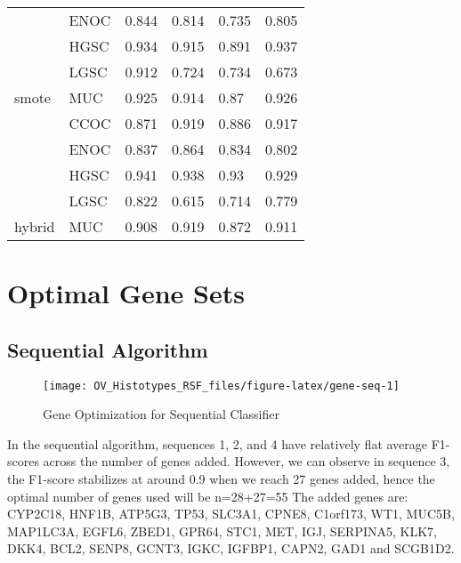 \documentclass[
]{report}
\begin{document}
\begin{table}
\begin{tabular}[t]{l|l|l|l|l|l}
\cline{2-6}
 & ENOC & 0.844 & 0.814 & 0.735 & 0.805\\
\cline{2-6}
 & HGSC & 0.934 & 0.915 & 0.891 & 0.937\\
\cline{2-6}
 & LGSC & 0.912 & 0.724 & 0.734 & 0.673\\
\cline{2-6}
\multirow{-5}{*}{\raggedright\arraybackslash smote} & MUC & 0.925 & 0.914 & 0.87 & 0.926\\
\cline{1-6}
 & CCOC & 0.871 & 0.919 & 0.886 & 0.917\\
\cline{2-6}
 & ENOC & 0.837 & 0.864 & 0.834 & 0.802\\
\cline{2-6}
 & HGSC & 0.941 & 0.938 & 0.93 & 0.929\\
\cline{2-6}
 & LGSC & 0.822 & 0.615 & 0.714 & 0.779\\
\cline{2-6}
\multirow{-5}{*}{\raggedright\arraybackslash hybrid} & MUC & 0.908 & 0.919 & 0.872 & 0.911\\
\hline
\end{tabular}
\end{table}

\hypertarget{optimal-gene-sets}{%
\section{Optimal Gene Sets}\label{optimal-gene-sets}}

\hypertarget{sequential-algorithm-1}{%
\subsection{Sequential Algorithm}\label{sequential-algorithm-1}}

\begin{figure}[H]

{\centering \texttt{[image: OV\_Histotypes\_RSF\_files/figure-latex/gene-seq-1]} 

}

\caption{Gene Optimization for Sequential Classifier}\label{fig:gene-seq}
\end{figure}

In the sequential algorithm, sequences 1, 2, and 4 have relatively flat average F1-scores across the number of genes added. However, we can observe in sequence 3, the F1-score stabilizes at around 0.9 when we reach 27 genes added, hence the optimal number of genes used will be n=28+27=55 The added genes are: CYP2C18, HNF1B, ATP5G3, TP53, SLC3A1, CPNE8, C1orf173, WT1, MUC5B, MAP1LC3A, EGFL6, ZBED1, GPR64, STC1, MET, IGJ, SERPINA5, KLK7, DKK4, BCL2, SENP8, GCNT3, IGKC, IGFBP1, CAPN2, GAD1 and SCGB1D2.
\end{document}
